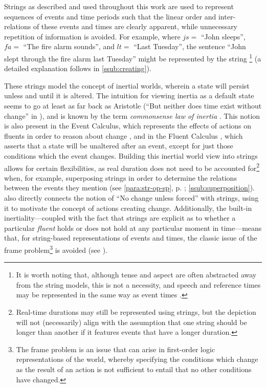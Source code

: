 \documentclass[a4paper,12pt,leqno]{article}
\newcommand{\vph}[1]{\vphantom{#1}}
\newcommand{\ebox}[1]{\fbox{$\vph{'(),}#1$}}
\newcommand{\EventString}[1]{%
	\renewcommand*{\do}[1]{\ebox{##1}}%
	\PipeParser{#1}%
}
\begin{document}
Strings as described and used throughout this work are used to represent sequences of events and time periods such that the linear order and inter-relations of these events and times are clearly apparent, while unnecessary repetition of information is avoided. For example, where $js =$ ``John sleeps'', $fa =$ ``The fire alarm sounds'', and $lt =$ ``Last Tuesday'', the sentence ``John slept through the fire alarm last Tuesday'' might be represented by the string \EventString{{}|lt|js,lt|fa,js,lt|js,lt|lt|{}}\footnote{It is worth noting that, although tense and aspect are often abstracted away from the string models, this is not a necessity, and speech and reference times may be represented in the same way as event times \citep{fernando2016regular,Derczynski2013,reichenbach1947elements}.} (a detailed explanation follows in \cref{ssub:creating}).

These strings model the concept of inertial worlds, wherein a state will persist unless and until it is altered. The intuition for viewing inertia as a default state seems to go at least as far back as Aristotle (``But neither does time exist without change'' in \textit{}), and is known by the term \textit{commonsense law of inertia} \citep[p. 19]{shanahan1997solving}. This notion is also present in the Event Calculus, which represents the effects of actions on fluents in order to reason about change \citep{Kowalski1986,Miller1999,Mueller2008}, and in the Fluent Calculus \citep{thielscher1999situation}, which asserts that a state will be unaltered after an event, except for just those conditions which the event changes.
Building this inertial world view into strings allows for certain flexibilities, as real duration does not need to be accounted for\footnote{Real-time durations may still be represented using strings, but the depiction will not (necessarily) align with the assumption that one string should be longer than another if it features events that have a longer duration.} when, for example, superposing strings in order to determine the relations between the events they mention (see \cref{para:str-op-sp}, p. \pageref{para:str-op-sp}; \cref{ssub:superposition}). \citet[p. 44]{Fernando2018} also directly connects the notion of ``No change unless forced'' with strings, using it to motivate the concept of actions creating change. Additionally, the built-in inertiality---coupled with the fact that strings are explicit as to whether a particular \textit{fluent} holds or does not hold at any particular moment in time---means that, for string-based representations of events and times, the classic issue of the frame problem\footnote{The frame problem is an issue that can arise in first-order logic representations of the world, whereby specifying the conditions which change as the result of an action is not sufficient to entail that no other conditions have changed.} is avoided (see \citet[pp. 30-31]{Mccarthy69somephilosophical}).
\end{document}
